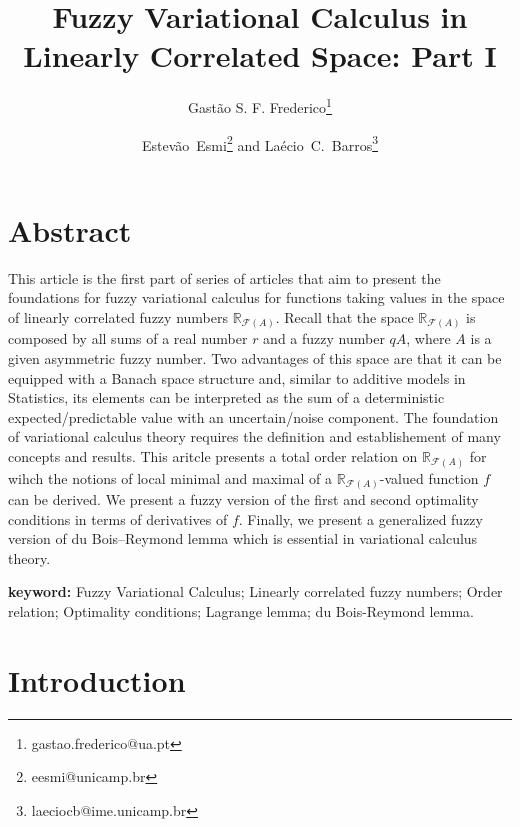 \documentclass[12pt,a4paper]{article}
\newcommand{\RFA}{\mathbb{R}_{\mathcal{F}(A)}}
\begin{document}
 \title{Fuzzy Variational Calculus in Linearly Correlated Space: Part I}

\author{Gastão S. F. Frederico\thanks{gastao.frederico@ua.pt}}

\author{Estevão~Esmi\thanks{eesmi@unicamp.br} \; and \; Laécio~C.~Barros\thanks{laeciocb@ime.unicamp.br}}

\date{}

\maketitle

{\small 
\section*{Abstract} 

This article is the first part of series of articles that aim to present the foundations for fuzzy variational calculus for functions taking values in the space of linearly correlated fuzzy numbers $\RFA$. 
Recall that the space $\RFA$ is composed by all sums of a real number $r$ and a fuzzy number $qA$, where  $A$ is a given asymmetric fuzzy number. Two advantages of this space are that it can be equipped with a Banach space structure and, similar to additive models in Statistics, its elements can be interpreted as the sum of a deterministic expected/predictable value with an uncertain/noise component. 
The foundation of variational calculus theory requires the definition and establishement of many concepts and results. This aritcle presents a total order relation on $\RFA$ for wihch the notions of local minimal and maximal of a $\RFA$-valued function $f$ can be derived. We present a fuzzy version of the first and second optimality conditions in terms of derivatives of $f$. 
Finally, we present a generalized  fuzzy version of du Bois--Reymond lemma which is essential in variational calculus theory.

{\bf keyword: } Fuzzy Variational Calculus; Linearly correlated fuzzy numbers; 
Order relation; Optimality conditions; Lagrange lemma; du Bois-Reymond lemma.
}

\section{Introduction}
\end{document}
